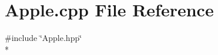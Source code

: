 \section{Apple.\-cpp File Reference}
\label{_apple_8cpp}
{\ttfamily \#include \char`\"{}Apple.\-hpp\char`\"{}}\\*
